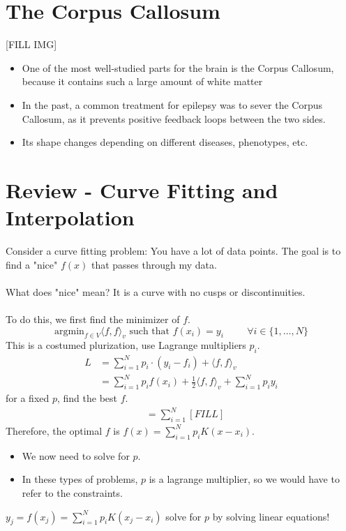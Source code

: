 \documentclass[10pt]{article}
\begin{document}
\section*{The Corpus Callosum}
\begin{center}
    [FILL IMG]
\end{center}
\begin{itemize}
    \item One of the most well-studied parts for the brain is the Corpus Callosum, because it contains such a large amount of white matter
    \item In the past, a common treatment for epilepsy was to sever the Corpus Callosum, as it prevents positive feedback loops between the two sides.
    \item Its shape changes depending on different diseases, phenotypes, etc.
\end{itemize}

\section*{Review - Curve Fitting and Interpolation}
Consider a curve fitting problem:  You have a lot of data points.  The goal is to find a "nice" $f(x)$ that passes through my data.\\\\ 
What does "nice" mean?  It is a curve with no cusps or discontinuities.\\\\
To do this, we first find the minimizer of $f$.
\[\text{argmin}_{f \in V} \langle f, f\rangle_v \text{ such that } f(x_i) = y_i \hspace{1cm} \forall i \in \{1, \dots, N\}\]
This is a costumed plurization, use Lagrange multipliers $p_i$.
\begin{align*}
    L &= \sum_{i = 1}^N p_i \cdot (y_i - f_i) + \langle f, f \rangle_v\\
    &= \sum_{i = 1}^N p_i f(x_i) + \frac{1}{2}\langle f, f \rangle_v + \sum_{i = 1}^N p_i y_i
\end{align*}
for a fixed $p$, find the best $f$.
\begin{align*}
    &= \sum_{i = 1}^N [FILL]
\end{align*}
Therefore, the optimal $f$ is $f(x) = \sum_{i = 1}^N p_i K(x - x_i)$.
\begin{itemize}
    \item We now need to solve for $p$.
    \item In these types of problems, $p$ is a lagrange multiplier, so we would have to refer to the constraints.
\end{itemize}
$y_{j} = f(x_j) = \sum_{i = 1}^N p_i K(x_j - x_i)$
solve for $p$ by solving linear equations!
\end{document}
